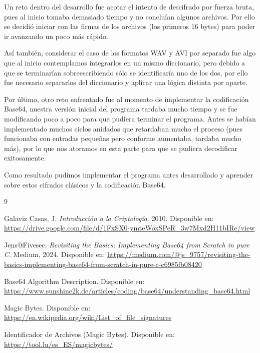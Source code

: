 \documentclass[12pt, a4paper]{article}
\begin{document}
Un reto dentro del desarrollo fue acotar el intento de descifrado por fuerza bruta, pues al inicio tomaba demasiado tiempo
y no concluían algunos archivos. Por ello se decidió iniciar con las firmas de los archivos (los primeros 16 bytes) para poder
ir avanzando un poco más rápido. 

Así también, considerar el caso de los formatos WAV y AVI por separado fue algo que al inicio contemplamos integrarlos en un 
mismo diccionario, pero debido a que se terminarían sobreescribiendo sólo se identificaría uno de los dos, por ello fue 
necesario separarlos del diccionario y aplicar una lógica distinta por aparte.

Por último, otro reto enfrentado fue al momento de implementar la codificación Base64, nuestra versión inicial del programa tardaba
mucho tiempo y se fue modificando poco a poco para que pudiera terminar el programa. Antes se habían implementado muchos ciclos anidados
que retardaban mucho el proceso (pues funcionaba con entradas pequeñas pero conforme aumentaba, tardaba mucho más), por lo que nos 
atoramos en esta parte para que se pudiera decodificar exitosamente.

Como resultado pudimos implementar el programa antes desarrollado y aprender sobre estos cifrados clásicos y la codificación Base64.



\begin{thebibliography}{9}

Galaviz Casas, J.
\textit{Introducción a la Criptología}.
2010.
Disponible en: \url{https://drive.google.com/file/d/1FxSX0-ymteWoxSPeR_3w7Mxd2H11bIRe/view}

Jens@Fivesec.
\textit{Revisiting the Basics: Implementing Base64 from Scratch in pure C}.
Medium, 2024.
Disponible en: \url{https://medium.com/@js_9757/revisiting-the-basics-implementing-base64-from-scratch-in-pure-c-c6985fb08420}

Base64 Algorithm Description.
Disponible en: \url{https://www.sunshine2k.de/articles/coding/base64/understanding_base64.html}

Magic Bytes.
Disponible en: \url{https://en.wikipedia.org/wiki/List_of_file_signatures}

Identificador de Archivos (Magic Bytes).
Disponible en: \url{https://tool.lu/es_ES/magicbytes/}

\end{thebibliography}
\end{document}
